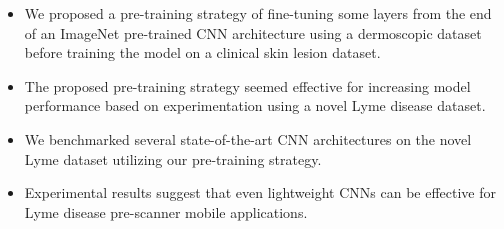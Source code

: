 \begin{tcolorbox}[enhanced,attach boxed title to top center={yshift=-3mm,yshifttext=-1mm},
	coltitle=black, colback=blue!5!white,colframe=blue!75!black,colbacktitle=violet!50!white,
	title=Key Points (Chapter \ref{chap:Pretraining}),fonttitle=\bfseries,
	boxed title style={colframe=black} ]
	\begin{itemize}
		\item We proposed a pre-training strategy of fine-tuning some layers from the end of an ImageNet pre-trained CNN architecture using a dermoscopic dataset before training the model on a clinical skin lesion dataset.
		\item The proposed pre-training strategy seemed effective for increasing model performance based on experimentation using a novel Lyme disease dataset.
		\item We benchmarked several state-of-the-art CNN architectures on the novel Lyme dataset utilizing our pre-training strategy.
		\item Experimental results suggest that even lightweight CNNs can be effective for Lyme disease pre-scanner mobile applications.
	\end{itemize}
\end{tcolorbox}

